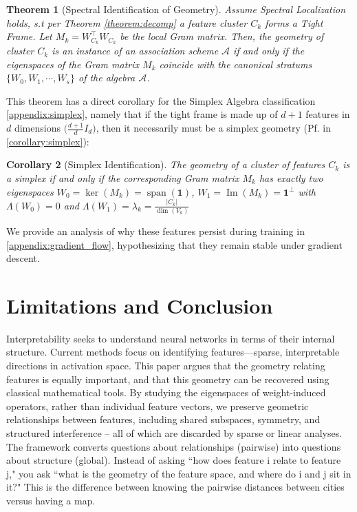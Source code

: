 \documentclass{article}
\theoremstyle{plain}
\newtheorem{theorem}{Theorem}
\newtheorem{corollary}[theorem]{Corollary}
\numberwithin{equation}{section}
\theoremstyle{definition}
\theoremstyle{remark}
\begin{document}
\begin{theorem}[Spectral Identification of Geometry]
    Assume Spectral Localization holds, s.t per Theorem \ref{theorem:decomp} a feature cluster $C_k$ forms a Tight Frame. Let $M_k = W_{C_k}^\top W_{C_k}$ be the local Gram matrix. Then, the geometry of cluster $C_k$ is an instance of an association scheme $\mathcal{A}$ if and only if the eigenspaces of the Gram matrix $M_k$ coincide with the canonical stratums $\{W_0, W_1, \cdots, W_s\}$ of the algebra $\mathcal{A}$. 
\end{theorem}
This theorem has a direct corollary for the Simplex Algebra classification \ref{appendix:simplex}, namely that if the tight frame is made up of $d+1$ features in $d$ dimensions $\big(\frac{d+1}{d}I_d\big)$, then it necessarily must be a simplex geometry (Pf. in \ref{corollary:simplex}):

\begin{corollary} [Simplex Identification]
The geometry of a cluster of features $C_k$ is a simplex if and only if the corresponding Gram matrix $M_{k}$ has exactly two eigenspaces $W_0 = \ker(M_{k}) = \operatorname{span}(\mathbf{1})$, $W_1 = \operatorname{Im}(M_k) = \mathbf{1}^\perp$ with 
$\Lambda(W_0)=0$ and  $\Lambda(W_1) = \lambda_k = \frac{|C_k|}{\dim(V_k)}$
\end{corollary}

We provide an analysis of why these features persist during training in \ref{appendix:gradient_flow}, hypothesizing that they remain stable under gradient descent.

\section{Limitations and Conclusion}

Interpretability seeks to understand neural networks in terms of their internal structure. Current methods focus on identifying features—sparse, interpretable directions in activation space. This paper argues that the geometry relating features is equally important, and that this geometry can be recovered using classical mathematical tools. By studying the eigenspaces of weight-induced operators, rather than individual feature vectors, we preserve geometric relationships between features, including shared subspaces, symmetry, and structured interference -- all of which are discarded by sparse or linear analyses. The framework converts questions about relationships (pairwise) into questions about structure (global). Instead of asking ``how does feature i relate to feature j," you ask ``what is the geometry of the feature space, and where do i and j sit in it?" This is the difference between knowing the pairwise distances between cities versus having a map.
\end{document}
